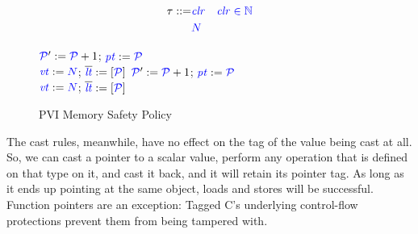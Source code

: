 \documentclass{llncs}
\begin{document}
\begin{figure}
  \color{blue}
  \begin{align*}
    \tau ::= & \color{blue} \mathit{clr} & \color{blue} \mathit{clr} \in \mathbb{N} \\
    & {\color{blue} N} \\
  \end{align*}
  
  \scriptsize
  \begin{minipage}[t]{0.3\textwidth}
    \vspace{-2.5em}

  \end{minipage}
  \begin{minipage}[t]{0.25\textwidth}
    \vspace{-2.5em}
    \localtruleblock
        {\(\mathcal{\color{blue} P}' := \mathcal{\color{blue} P}+1\);
          \(\mathit{\color{blue} pt} := \mathcal{\color{blue} P}\)\\
          \(\mathit{\color{blue} vt} := {\color{blue} N}\);
          \(\overline{\color{blue} \mathit{\color{blue} lt}} := \left[ \mathcal{\color{blue} P} \right]\)
        }
    \malloctruleblock
        {\(\mathcal{\color{blue} P}' := \mathcal{\color{blue} P}+1\);
          \(\mathit{\color{blue} pt} := \mathcal{\color{blue} P}\) \\
          \(\mathit{\color{blue} vt} := {\color{blue} N}\);
          \(\overline{\color{blue} \mathit{\color{blue} lt}} := \left[ \mathcal{\color{blue} P} \right]\)
        }
  \end{minipage}
  \begin{minipage}[t]{0.3\textwidth}
    \vspace{-2.5em}

  \end{minipage}

  \caption{PVI Memory Safety Policy}
  \label{fig:pvi}
\end{figure}

The cast rules, meanwhile, have no effect on the tag of the value being cast at all. So,
we can cast a pointer to a scalar value, perform any operation that is defined on that type
on it, and cast it back, and it will retain its pointer tag. As long as it ends up pointing
at the same object, loads and stores will be successful. Function pointers are an exception:
Tagged C's underlying control-flow protections prevent them from being tampered with.
\end{document}
